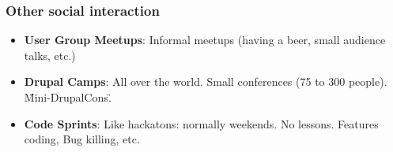\begin{frame}[allowframebreaks]
\frametitle{Other social interaction}
\begin{itemize}
\item \textbf{User Group Meetups}: Informal meetups (having a beer, small audience talks, etc.)
\item \textbf{Drupal Camps}: All over the world. Small conferences (75 to 300 people). \"Mini-DrupalCons\".
\item \textbf{Code Sprints}: Like hackatons: normally weekends. No lessons. Features coding, Bug killing, etc.
\end{itemize}

\end{frame}
